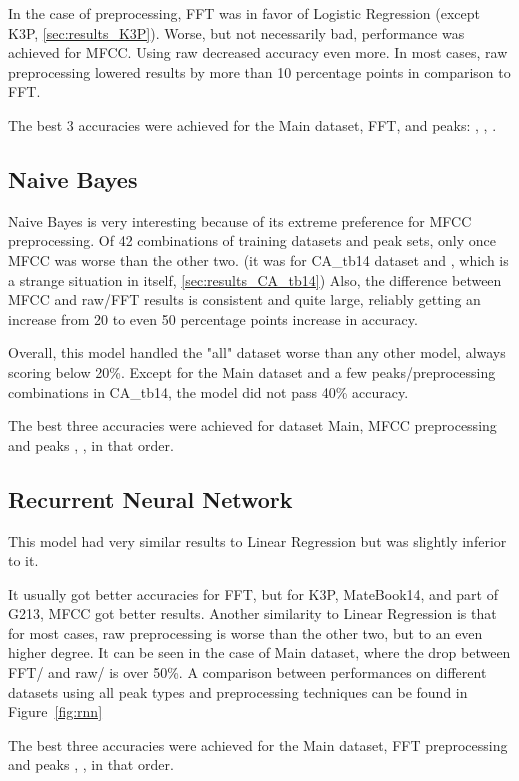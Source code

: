\documentclass[../main.tex]{subfiles}
\begin{document}
In the case of preprocessing, FFT was in favor of Logistic Regression (except K3P, \ref{sec:results_K3P}). Worse, but not necessarily bad, performance was achieved for MFCC. Using raw decreased accuracy even more. In most cases, raw preprocessing lowered results by more than 10 percentage points in comparison to FFT. 

The best 3 accuracies were achieved for the Main dataset, FFT, and peaks: , , .

\subsection{Naive Bayes}
Naive Bayes is very interesting because of its extreme preference for MFCC preprocessing. Of 42 combinations of training datasets and peak sets, only once MFCC was worse than the other two. (it was for CA\_tb14 dataset and , which is a strange situation in itself, \ref{sec:results_CA_tb14}) Also, the difference between MFCC and raw/FFT results is consistent and quite large, reliably getting an increase from 20 to even 50 percentage points increase in accuracy.

Overall, this model handled the "all" dataset worse than any other model, always scoring below 20\%. Except for the Main dataset and a few peaks/preprocessing combinations in CA\_tb14, the model did not pass 40\% accuracy.

The best three accuracies were achieved for dataset Main, MFCC preprocessing and peaks , ,  in that order.

\subsection{Recurrent Neural Network}
This model had very similar results to Linear Regression but was slightly inferior to it. 

It usually got better accuracies for FFT, but for K3P, MateBook14, and part of G213, MFCC got better results. Another similarity to Linear Regression is that for most cases, raw preprocessing is worse than the other two, but to an even higher degree. It can be seen in the case of Main dataset, where the drop between FFT/ and raw/ is over 50\%. A comparison between performances on different datasets using all peak types and preprocessing techniques can be found in Figure~\ref{fig:rnn}

The best three accuracies were achieved for the Main dataset, FFT preprocessing and peaks , ,  in that order.
\end{document}
